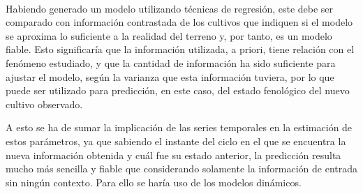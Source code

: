 \\
\par Habiendo generado un modelo utilizando técnicas de regresión, este debe ser comparado con información contrastada de los cultivos que indiquen si el modelo se aproxima lo suficiente a la realidad del terreno y, por tanto, es un modelo fiable. Esto significaría que la información utilizada, a priori, tiene relación con el fenómeno estudiado, y que la cantidad de información ha sido suficiente para ajustar el modelo, según la varianza que esta información tuviera, por lo que puede ser utilizado para predicción, en este caso, del estado fenológico del nuevo cultivo observado. 
\\
\par A esto se ha de sumar la implicación de las series temporales en la estimación de estos parámetros, ya que sabiendo el instante del ciclo en el que se encuentra la nueva información obtenida y cuál fue su estado anterior, la predicción resulta mucho más sencilla y fiable que considerando solamente la información de entrada sin ningún contexto. Para ello se haría uso de los modelos dinámicos. 